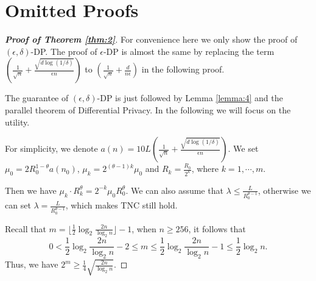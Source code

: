 \documentclass[12pt]{alt2022} %
\begin{document}
 \begin{figure*}[!htbp]
\centering
{}
\quad
{}
\quad
{}
\quad
{}
\caption{ Results of $l_2$ regularized squared logistic regression problem (\ref{eq24}) with  different privacy budget $\epsilon$.\label{fig4}}
\end{figure*}

\section{Omitted Proofs}
\begin{proof}[{\bf Proof of Theorem \ref{thm:2}}]
For convenience here we only show the proof of $(\epsilon,\delta)$-DP. The proof of $\epsilon$-DP is almost the same by replacing the term $(\frac{1}{\sqrt{n}}+\frac{\sqrt{d\log(1/\delta)}}{\epsilon n})$ to $(\frac{1}{\sqrt{n}}+\frac{d}{n\epsilon})$ in the following proof. 

		The guarantee of $(\epsilon,\delta)$-DP is just followed by Lemma \ref{lemma:4} and the parallel theorem of Differential Privacy. In the following we will focus on the utility. 
		
		
For simplicity, we denote $a(n)=10L\left(\frac{1}{\sqrt{n}}+\frac{\sqrt{d\log(1/\delta)}}{\epsilon n}\right)$. We set $\mu_0=2R_0^{1-\theta} a(n_0)$, $\mu_k=2^{(\theta-1)k}\mu_0$ and $R_k=\frac{R_0}{2^k}$, where $k=1,\cdots,m$.

Then we have $\mu_k\cdot R_k^{\theta}=2^{-k}\mu_0 R_0^{\theta}$.
We can also assume that $\lambda \leq \frac{L}{R_0^{\theta-1}}$, otherwise we can set $\lambda= \frac{L}{R_0^{\theta-1}}$, which makes TNC still hold.

Recall that $m=\lfloor \frac{1}{2}\log_2\frac{2n}{\log_2 n}\rfloor -1$, when $n\geq 256$, it follows that 
\begin{equation*}
0< \frac{1}{2}\log_2\frac{2n}{\log_2 n}-2\leq m\leq \frac{1}{2}\log_2\frac{2n}{\log_2 n}-1\leq \frac{1}{2}\log_2 n. 
\end{equation*}
 Thus, we have $2^m\geq \frac{1}{4}\sqrt{\frac{2n}{\log_2 n}}$.


\end{proof}
\end{document}
